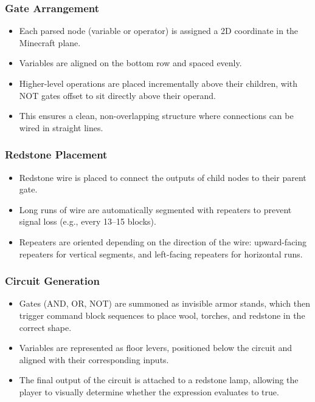 \documentclass[11pt]{diazessay} %
\begin{document}
\subsubsection*{Gate Arrangement}
\begin{itemize}
    \item Each parsed node (variable or operator) is assigned a
    2D coordinate in the Minecraft plane.
    \item Variables are aligned on the bottom row and spaced evenly.
    \item Higher-level operations are placed incrementally above their
    children, with NOT gates offset to sit directly above their operand.
    \item This ensures a clean, non-overlapping structure where
    connections can be wired in straight lines.
\end{itemize}

\subsubsection*{Redstone Placement}
\begin{itemize}
    \item Redstone wire is placed to connect the outputs of child nodes
    to their parent gate.
    \item Long runs of wire are automatically segmented with repeaters
    to prevent signal loss (e.g., every 13–15 blocks).
    \item Repeaters are oriented depending on the direction of the wire:
    upward-facing repeaters for vertical segments, and left-facing
    repeaters for horizontal runs.
\end{itemize}

\subsubsection*{Circuit Generation}
\begin{itemize}
    \item Gates (AND, OR, NOT) are summoned as invisible armor stands,
    which then trigger command block sequences to place wool, torches,
    and redstone in the correct shape.
    \item Variables are represented as floor levers, positioned below
    the circuit and aligned with their corresponding inputs.
    \item The final output of the circuit is attached to a redstone lamp,
    allowing the player to visually determine whether the expression
    evaluates to true.
\end{itemize}
\end{document}
